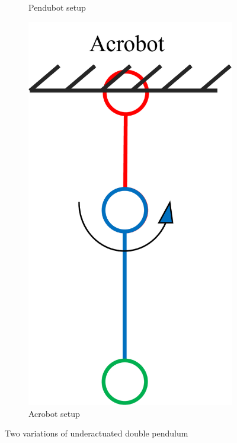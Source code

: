 \begin{figure}[htbp]
\begin{subfigure}[b]{0.2\textwidth}
        \caption{Pendubot setup}
    \end{subfigure}
    \begin{subfigure}[b]{0.2\textwidth}
        \includegraphics[width=\textwidth]{figures/Acrobot_explained.png}
        \caption{Acrobot setup}
    \end{subfigure}
    \caption{Two variations of underactuated double pendulum}
\end{figure}

